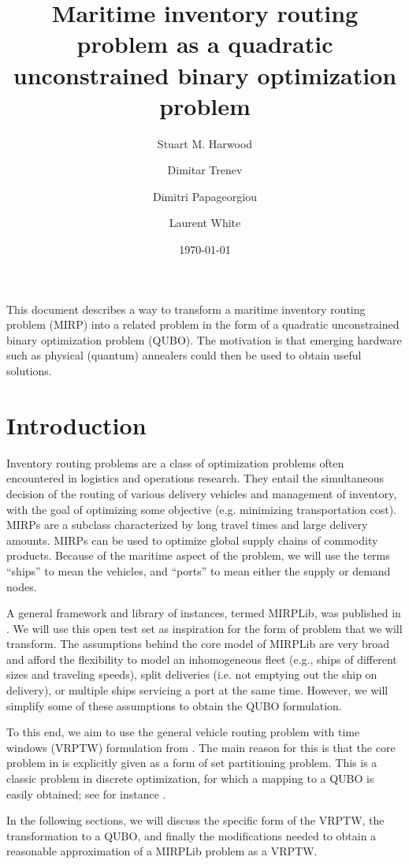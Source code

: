 \documentclass[11pt]{article}
\title{Maritime inventory routing problem as a quadratic unconstrained binary optimization problem}
\author{Stuart M. Harwood \and Dimitar Trenev \and Dimitri Papageorgiou \and Laurent White}
\date{\today}
\theoremstyle{definition}
\newcommand{\0}{\mathbf{0}}
\begin{document}
\maketitle

This document describes a way to transform a maritime inventory routing problem (MIRP) into a related problem in the form of a quadratic unconstrained binary optimization problem (QUBO).
The motivation is that emerging hardware such as physical (quantum) annealers could then be used to obtain useful solutions.

\section{Introduction}
Inventory routing problems are a class of optimization problems often encountered in logistics and operations research.
They entail the simultaneous decision of the routing of various delivery vehicles and management of inventory, with the goal of optimizing some objective (e.g. minimizing transportation cost).
MIRPs are a subclass characterized by long travel times and large delivery amounts.
MIRPs can be used to optimize global supply chains of commodity products.
Because of the maritime aspect of the problem, we will use the terms ``ships'' to mean the vehicles, and ``ports'' to mean either the supply or demand nodes.

A general framework and library of instances, termed MIRPLib, was published in \cite{mirplib}.
We will use this open test set as inspiration for the form of problem that we will transform.
The assumptions behind the core model of MIRPLib are very broad and afford the flexibility to model an inhomogeneous fleet (e.g., ships of different sizes and traveling speeds), split deliveries (i.e. not emptying out the ship on delivery), or multiple ships servicing a port at the same time.
However, we will simplify some of these assumptions to obtain the QUBO formulation.

To this end, we aim to use the general vehicle routing problem with time windows (VRPTW) formulation from \cite{desrochersEA92}.
The main reason for this is that the core problem in \cite{desrochersEA92} is explicitly given as a form of set partitioning problem. 
This is a classic problem in discrete optimization, for which a mapping to a QUBO is easily obtained;
see for instance \cite[\S4.1]{lucas14}. %

In the following sections, we will discuss the specific form of the VRPTW, the transformation to a QUBO,  and finally the modifications needed to obtain a reasonable approximation of a MIRPLib problem as a VRPTW.
\end{document}
